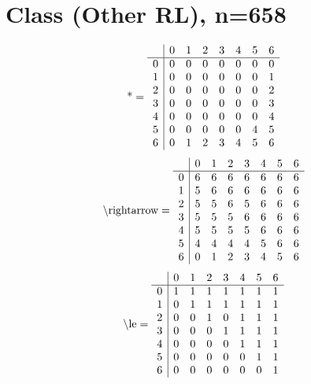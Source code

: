 \documentclass[11pt]{article}
\begin{document}
\section{Class (Other RL), n=658}
\[\text{*} = 
\begin{array}{r | r r r r r r r}
 & 0 & 1 & 2 & 3 & 4 & 5 & 6 \\ \hline
0 & 0 & 0 & 0 & 0 & 0 & 0 & 0 \\
1 & 0 & 0 & 0 & 0 & 0 & 0 & 1 \\
2 & 0 & 0 & 0 & 0 & 0 & 0 & 2 \\
3 & 0 & 0 & 0 & 0 & 0 & 0 & 3 \\
4 & 0 & 0 & 0 & 0 & 0 & 0 & 4 \\
5 & 0 & 0 & 0 & 0 & 0 & 4 & 5 \\
6 & 0 & 1 & 2 & 3 & 4 & 5 & 6 \\
\end{array}
\]
\[\text{\textbackslash rightarrow} = 
\begin{array}{r | r r r r r r r}
 & 0 & 1 & 2 & 3 & 4 & 5 & 6 \\ \hline
0 & 6 & 6 & 6 & 6 & 6 & 6 & 6 \\
1 & 5 & 6 & 6 & 6 & 6 & 6 & 6 \\
2 & 5 & 5 & 6 & 5 & 6 & 6 & 6 \\
3 & 5 & 5 & 5 & 6 & 6 & 6 & 6 \\
4 & 5 & 5 & 5 & 5 & 6 & 6 & 6 \\
5 & 4 & 4 & 4 & 4 & 5 & 6 & 6 \\
6 & 0 & 1 & 2 & 3 & 4 & 5 & 6 \\
\end{array}
\]
\[\text{\textbackslash le} = 
\begin{array}{r | r r r r r r r}
 & 0 & 1 & 2 & 3 & 4 & 5 & 6 \\ \hline
0 & 1 & 1 & 1 & 1 & 1 & 1 & 1 \\
1 & 0 & 1 & 1 & 1 & 1 & 1 & 1 \\
2 & 0 & 0 & 1 & 0 & 1 & 1 & 1 \\
3 & 0 & 0 & 0 & 1 & 1 & 1 & 1 \\
4 & 0 & 0 & 0 & 0 & 1 & 1 & 1 \\
5 & 0 & 0 & 0 & 0 & 0 & 1 & 1 \\
6 & 0 & 0 & 0 & 0 & 0 & 0 & 1 \\
\end{array}
\]
\end{document}
